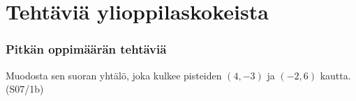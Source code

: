 \section{Tehtäviä ylioppilaskokeista}

\subsubsection*{Pitkän oppimäärän tehtäviä}

\begin{tehtava}
	Muodosta sen suoran yhtälö, joka kulkee pisteiden $(4, -3)$ ja $(-2,6)$ kautta. (S07/1b)
\end{tehtava}



